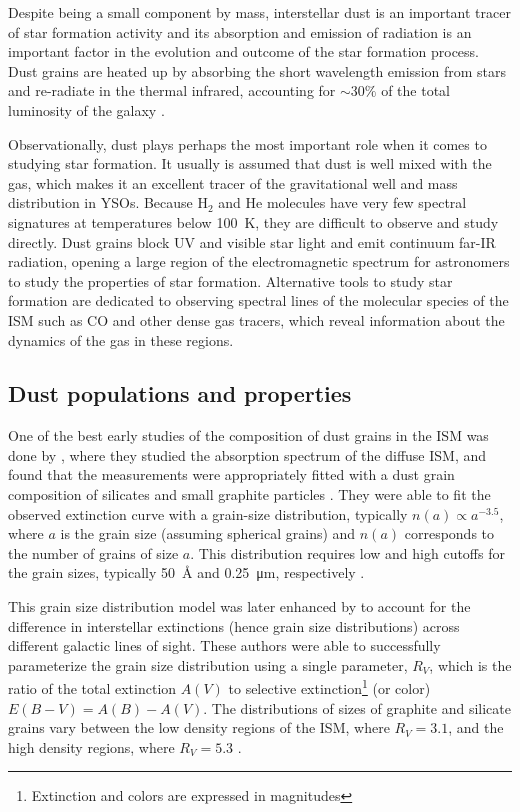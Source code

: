 Despite being a small component by mass, interstellar dust is an important tracer of star formation activity and its absorption and emission of radiation is an important factor in the evolution and outcome of the star formation process. Dust grains are heated up by absorbing the short wavelength emission from stars and re-radiate in the thermal infrared, accounting for $\sim 30\%$ of the total luminosity of the galaxy \citep{Mathis:1990jk}. 

Observationally, dust plays perhaps the most important role when it comes to studying star formation. It usually is assumed that dust is well mixed with the gas, which makes it an excellent tracer of the gravitational well and mass distribution in YSOs. Because H$_2$ and He molecules have very few spectral signatures at temperatures below \SI{100}{\kelvin}, they are difficult to observe and study directly. Dust grains block UV and visible star light and emit continuum far-IR radiation, opening a large region of the electromagnetic spectrum for astronomers to study the properties of star formation. Alternative tools to study star formation are dedicated to observing spectral lines of the molecular species of the ISM such as CO and other dense gas tracers, which reveal information about the dynamics of the gas in these regions.%


\subsection{Dust populations and properties}


One of the best early studies of the composition of dust grains in the ISM was done by \citet{Mathis:1977hp}, where they studied the absorption spectrum of the diffuse ISM, and found that the measurements were appropriately fitted with a dust grain composition of silicates and small graphite particles \citep{Stecher:1965eq}. They were able to fit the observed extinction curve with a grain-size distribution, typically $n(a) \propto a^{-3.5}$, where $a$ is the grain size (assuming spherical grains) and $n(a)$ corresponds to the number of grains of size $a$. This distribution requires low and high cutoffs for the grain sizes, typically \SI{50}{\angstrom} and \SI{0.25}{\micro\meter}, respectively \citep{Weingartner:2001du}.

This grain size distribution model was later enhanced by \citet{Cardelli:1989dp} to account for the difference in interstellar extinctions (hence grain size distributions) across different galactic lines of sight. These authors were able to successfully parameterize the grain size distribution using a single parameter, $R_V$, which is the ratio of the total extinction $A(V)$ to selective extinction\footnote{Extinction and colors are expressed in magnitudes} (or color) $E(B-V) = A(B) - A(V)$. The distributions of sizes of graphite and silicate grains vary between the low density regions of the ISM, where $R_V = 3.1$, and the high density regions, where $R_V = 5.3$ \citep{Kim:1994iu}. 

